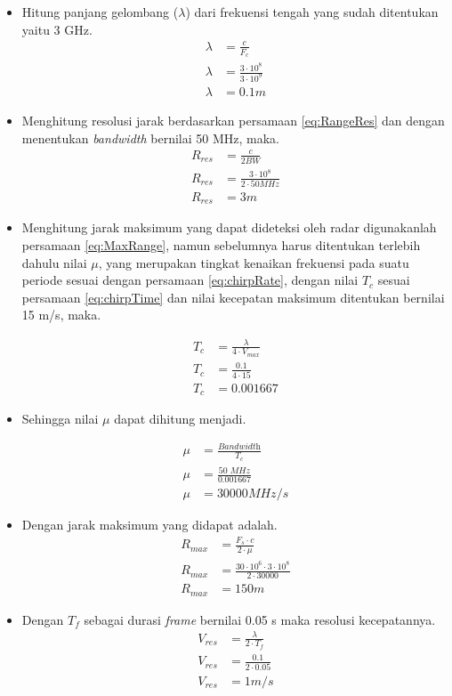 \begin{itemize}
	\item Hitung panjang gelombang ($\lambda$) dari frekuensi tengah yang sudah ditentukan yaitu 3 GHz.
	\begin{align*}
		\lambda &= \frac{c}{F_{c}}\\
		\lambda &= \frac{3 \cdot 10^{8}}{3 \cdot 10^{9}}\\
		\lambda &= 0.1 m
	\end{align*}

	\item Menghitung resolusi jarak berdasarkan persamaan \ref{eq:RangeRes} dan dengan menentukan \textit{bandwidth} bernilai 50 MHz, maka.
		\begin{align*}
			R_{res} &= \frac{c}{2 BW} \\
			R_{res} &= \frac{3 \cdot 10^{8}}{2 \cdot 50 MHz}\\
			R_{res} &= 3 m
		\end{align*}
	\item Menghitung jarak maksimum yang dapat dideteksi oleh radar digunakanlah persamaan \ref{eq:MaxRange}, namun sebelumnya harus ditentukan terlebih dahulu nilai $\mu$, yang merupakan tingkat kenaikan frekuensi pada suatu periode sesuai dengan persamaan \ref{eq:chirpRate}, dengan nilai $T_{c}$ sesuai persamaan \ref{eq:chirpTime} dan nilai kecepatan maksimum ditentukan bernilai 15 m/s, maka.
	
	\begin{align*}
		T_{c} &= \frac{\lambda}{4 \cdot V_{max}}\\
		T_{c} &= \frac{0.1}{4 \cdot 15}\\
		T_{c} &= 0.001667
	\end{align*}

	\item 
	Sehingga nilai $\mu$ dapat dihitung menjadi.

		\begin{align*}
		\mu &= \frac{\textit{Bandwidth}}{T_{c}}\\
		\mu &= \frac{\textit{50 MHz}}{0.001667}\\
		\mu &= 30000 MHz/s
		\end{align*}

	\item 	
	Dengan jarak maksimum yang didapat adalah.
		\begin{align*}
		R_{max} &= \frac{F_{s} \cdot c}{2 \cdot \mu}\\
		R_{max} &= \frac{30 \cdot 10^{6} \cdot 3 \cdot 10^{8}}{2 \cdot 30000}\\
		R_{max} &= 150 m
		\end{align*}

	\item 
	Dengan $T_{f}$ sebagai durasi \textit{frame} bernilai 0.05 s maka resolusi kecepatannya.
		\begin{align*}
			V_{res} &= \frac{\lambda}{2 \cdot T_{f}}\\
			V_{res} &= \frac{0.1}{2 \cdot 0.05}\\
			V_{res} &= 1 m/s
		\end{align*}

\end{itemize}

